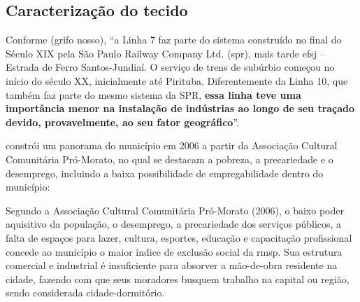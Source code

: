 	\subsection{Caracterização do tecido}
	
	Conforme  (grifo nosso), ``a Linha 7 faz parte do sistema construído no final do Século XIX pela São Paulo Railway Company Ltd. (\gls{spr}), mais tarde \gls{efsj} – Estrada de Ferro Santos-Jundiaí. O serviço de trens de subúrbio começou no início do século XX, inicialmente até Pirituba. Diferentemente da Linha 10, que também faz parte do mesmo sistema da SPR, \textbf{essa linha teve uma importância menor na instalação de indústrias ao longo de seu traçado devido, provavelmente, ao seu fator geográfico}''.
	
	
	 constrói um panorama do município em 2006 a partir da Associação Cultural Comunitária Pró-Morato, no qual se destacam a pobreza, a precariedade e o desemprego, incluindo a baixa possibilidade de empregabilidade dentro do município:
	
	\begin{citacao}
		Segundo a Associação Cultural Comunitária Pró-Morato (2006), o baixo poder aquisitivo da população, o desemprego, a precariedade dos serviços públicos, a falta de espaços para lazer, cultura, esportes, educação e capacitação profissional concede ao município o maior índice de exclusão social da \gls{rmsp}. Sua estrutura comercial e industrial é insuficiente para absorver a mão-de-obra residente na cidade, fazendo com que seus moradores busquem trabalho na capital ou região, sendo considerada cidade-dormitório.
	\end{citacao}
	
